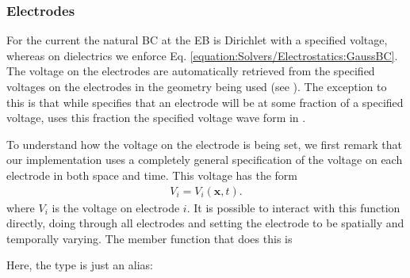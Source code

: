 \documentclass[letterpaper,10pt,english]{sphinxmanual}
\begin{document}
\subsubsection{Electrodes}
\label{\detokenize{Solvers/Electrostatics:electrodes}}
For the current  the natural BC at the EB is Dirichlet with a specified voltage, whereas on dielectrics we enforce Eq. \ref{equation:Solvers/Electrostatics:GaussBC}.
The voltage on the electrodes are automatically retrieved from the specified voltages on the electrodes in the geometry being used (see ).
The exception to this is that while  specifies that an electrode will be at some fraction of a specified voltage,  uses this fraction  the specified voltage wave form in .

To understand how the voltage on the electrode is being set, we first remark that our implementation uses a completely general specification of the voltage on each electrode in both space and time.
This voltage has the form
\begin{equation*}
\begin{split}V_i = V_i\left(\mathbf{x}, t\right).\end{split}
\end{equation*}
where \(V_i\) is the voltage on electrode \(i\).
It is possible to interact with this function directly, doing through all electrodes and setting the electrode to be spatially and temporally varying.
The member function that does this is

\begin{sphinxVerbatim}[commandchars=\\\{\},formatcom=\scriptsize]
   
                                                  
\end{sphinxVerbatim}

Here, the type  is just an alias:

\begin{sphinxVerbatim}[commandchars=\\\{\},formatcom=\scriptsize]
        
\end{sphinxVerbatim}
\end{document}
